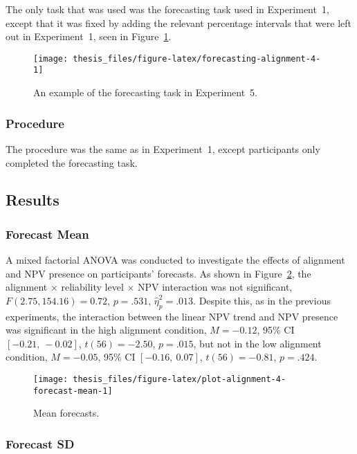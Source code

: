 \documentclass[a4paper, nobind]{templates/ociamthesis}
\theoremstyle{definition}
\theoremstyle{definition}
\theoremstyle{definition}
\theoremstyle{definition}
\theoremstyle{remark}
\begin{document}
The only task that was used was the forecasting task used in Experiment~1,
except that it was fixed by adding the relevant percentage intervals that were
left out in Experiment~1, seen in Figure~\ref{fig:forecasting-alignment-4}.



\begin{figure}
\texttt{[image: thesis\_files/figure-latex/forecasting-alignment-4-1]} \caption{An example of the forecasting task in Experiment~5.}\label{fig:forecasting-alignment-4}
\end{figure}

\subsubsection{Procedure}

The procedure was the same as in Experiment~1, except participants only
completed the forecasting task.

\subsection{Results}

\subsubsection{Forecast Mean}

A mixed factorial ANOVA was conducted to investigate the effects of alignment
and NPV presence on participants' forecasts. As shown in
Figure~\ref{fig:plot-alignment-4-forecast-mean}, the alignment \(\times\)
reliability level \(\times\) NPV interaction was not significant,
\(F(2.75, 154.16) = 0.72\), \(p = .531\), \(\hat{\eta}^2_p = .013\).
Despite this, as in the previous experiments, the interaction between the linear
NPV trend and NPV presence was significant in the high alignment condition,
\(M = -0.12\), 95\% CI \([-0.21,~-0.02]\), \(t(56) = -2.50\), \(p = .015\), but not in the
low alignment condition,
\(M = -0.05\), 95\% CI \([-0.16,~0.07]\), \(t(56) = -0.81\), \(p = .424\).



\begin{figure}
\texttt{[image: thesis\_files/figure-latex/plot-alignment-4-forecast-mean-1]} \caption{Mean forecasts.}\label{fig:plot-alignment-4-forecast-mean}
\end{figure}

\hypertarget{forecast-sd-alignment-4}{%
\subsubsection{Forecast SD}\label{forecast-sd-alignment-4}}
\end{document}
